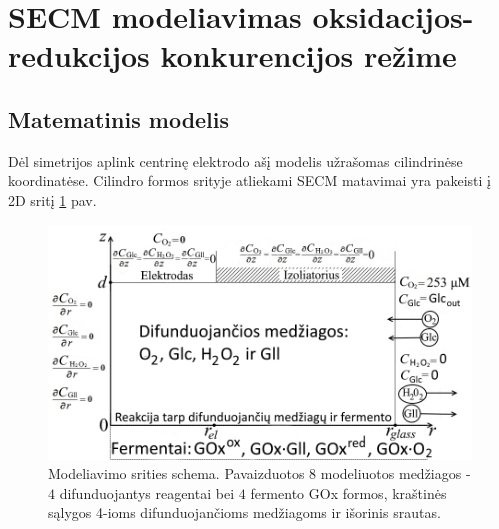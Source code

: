 
\section{SECM modeliavimas oksidacijos-redukcijos konkurencijos režime}
\label{sec:santr_reakc}



\subsection{Matematinis modelis}

Dėl simetrijos aplink centrinę elektrodo ašį modelis užrašomas cilindrinėse koordinatėse. Cilindro formos srityje atliekami SECM matavimai yra pakeisti į 2D sritį \ref{fig:santr_Domain} pav.


\begin{figure}[ht!]
\centering
\includegraphics[width=0.8\linewidth]{summary/Model_domainLT.png}
\caption{Modeliavimo srities schema. Pavaizduotos $8$ modeliuotos medžiagos - $4$ difunduojantys reagentai bei $4$ fermento GOx formos, kraštinės sąlygos 4-ioms difunduojančioms medžiagoms ir išorinis srautas.}
\label{fig:santr_Domain}
\end{figure}

